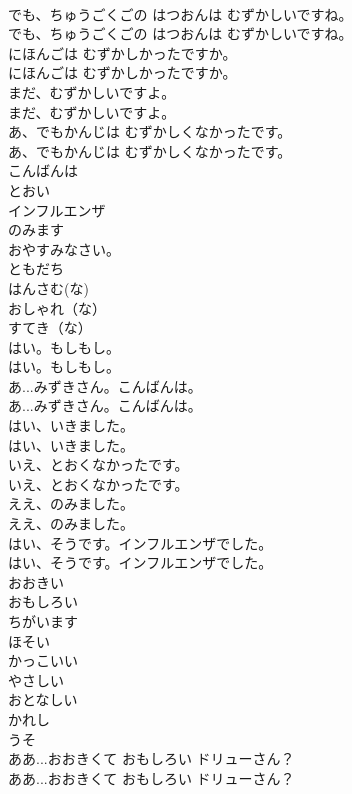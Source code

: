 \documentclass[8pt]{extreport}
\begin{document}
\begin{CJK}{UTF8}{min}
\\	でも、ちゅうごくごの はつおんは むずかしいですね。	
\\	でも、ちゅうごくごの はつおんは むずかしいですね。 
\\	にほんごは むずかしかったですか。	
\\	にほんごは むずかしかったですか。 
\\	まだ、むずかしいですよ。	
\\	まだ、むずかしいですよ。 
\\	あ、でもかんじは むずかしくなかったです。	
\\	あ、でもかんじは むずかしくなかったです。 
\\	こんばんは
\\	とおい
\\	インフルエンザ
\\	のみます
\\	おやすみなさい。
\\	ともだち
\\	はんさむ(な)
\\	おしゃれ（な）
\\	すてき（な）
\\	はい。もしもし。	
\\	はい。もしもし。 
\\	あ...みずきさん。こんばんは。	
\\	あ...みずきさん。こんばんは。 
\\	はい、いきました。	
\\	はい、いきました。 
\\	いえ、とおくなかったです。	
\\	いえ、とおくなかったです。 
\\	ええ、のみました。	
\\	ええ、のみました。 
\\	はい、そうです。インフルエンザでした。	
\\	はい、そうです。インフルエンザでした。 
\\	おおきい
\\	おもしろい
\\	ちがいます
\\	ほそい
\\	かっこいい
\\	やさしい
\\	おとなしい
\\	かれし
\\	うそ
\\	ああ...おおきくて おもしろい ドリューさん？	
\\	ああ...おおきくて おもしろい ドリューさん？ 

\end{CJK}
\end{document}

